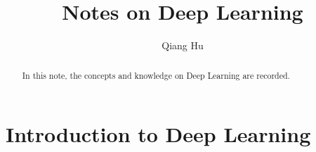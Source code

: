 \documentclass[]{article}
\title{Notes on Deep Learning}
\author{Qiang Hu}
\begin{document}
\maketitle

\begin{abstract}
In this note, the concepts and knowledge on Deep Learning are recorded. 
\end{abstract}

\section{Introduction to Deep Learning}
\end{document}

